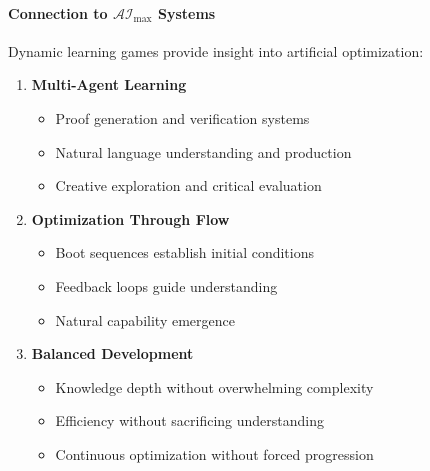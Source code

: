 \documentclass[12pt]{article}
\begin{document}
\paragraph{Connection to \( \mathcal{AI}_{\text{max}} \) Systems}
Dynamic learning games provide insight into artificial optimization:
\begin{enumerate}
    \item \textbf{Multi-Agent Learning}
    \begin{itemize}
        \item Proof generation and verification systems
        \item Natural language understanding and production
        \item Creative exploration and critical evaluation
    \end{itemize}
    
    \item \textbf{Optimization Through Flow}
    \begin{itemize}
        \item Boot sequences establish initial conditions
        \item Feedback loops guide understanding
        \item Natural capability emergence
    \end{itemize}
    
    \item \textbf{Balanced Development}
    \begin{itemize}
        \item Knowledge depth without overwhelming complexity
        \item Efficiency without sacrificing understanding
        \item Continuous optimization without forced progression
    \end{itemize}
\end{enumerate}
\end{document}
